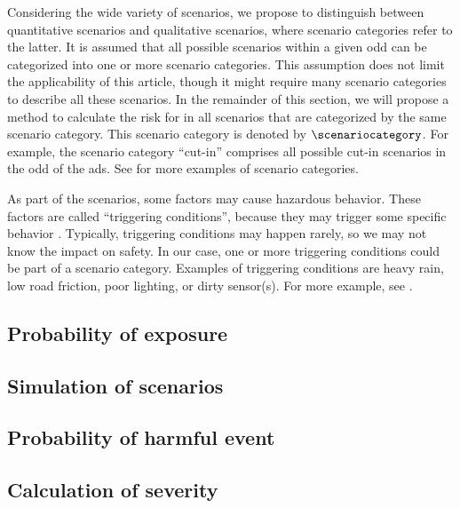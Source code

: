 Considering the wide variety of scenarios, we propose to distinguish between quantitative scenarios and qualitative scenarios, where scenario categories refer to the latter.
It is assumed that all possible scenarios within a given \ac{odd} can be categorized into one or more scenario categories. 
This assumption does not limit the applicability of this article, though it might require many scenario categories to describe all these scenarios.
In the remainder of this section, we will propose a method to calculate the risk for  in all scenarios that are categorized by the same scenario category.
This scenario category is denoted by $\scenariocategory$.
For example, the scenario category ``cut-in'' comprises all possible cut-in scenarios in the \ac{odd} of the \ac{ads}.
See \autocite{degelder2019scenariocategories} for more examples of scenario categories.


\begin{remark}
	As part of the scenarios, some factors may cause hazardous behavior. 
	These factors are called ``triggering conditions'', because they may trigger some specific behavior \autocite{ISO21448}.
	Typically, triggering conditions may happen rarely, so we may not know the impact on safety. 
	In our case, one or more triggering conditions could be part of a scenario category.
	Examples of triggering conditions are heavy rain, low road friction, poor lighting, or dirty sensor(s). 
	For more example, see \autocite{ISO21448}.
\end{remark}



\subsection{Probability of exposure}
\label{sec:exposure}



\subsection{Simulation of scenarios}
\label{sec:simulation}



\subsection{Probability of harmful event}
\label{sec:harmful}



\subsection{Calculation of severity}
\label{sec:severity}
